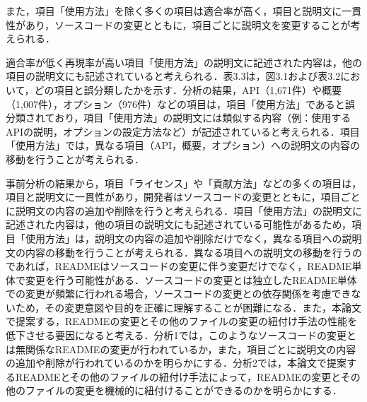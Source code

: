 \documentclass[submit]{ipsj}
\begin{document}
また，項目「使用方法」を除く多くの項目は適合率が高く，項目と説明文に一貫性があり，ソースコードの変更とともに，項目ごとに説明文を変更することが考えられる．

適合率が低く再現率が高い項目「使用方法」の説明文に記述された内容は，他の項目の説明文にも記述されていると考えられる．表3.3は，図3.1および表3.2において，どの項目と誤分類したかを示す．分析の結果，API（1,671件）や概要（1,007件），オプション（976件）などの項目は，項目「使用方法」であると誤分類されており，項目「使用方法」の説明文には類似する内容（例：使用するAPIの説明，オプションの設定方法など）が記述されていると考えられる．項目「使用方法」では，異なる項目（API，概要，オプション）への説明文の内容の移動を行うことが考えられる．


事前分析の結果から，項目「ライセンス」や「貢献方法」などの多くの項目は，項目と説明文に一貫性があり，開発者はソースコードの変更とともに，項目ごとに説明文の内容の追加や削除を行うと考えられる．項目「使用方法」の説明文に記述された内容は，他の項目の説明文にも記述されている可能性があるため，項目「使用方法」は，説明文の内容の追加や削除だけでなく，異なる項目への説明文の内容の移動を行うことが考えられる．異なる項目への説明文の移動を行うのであれば，READMEはソースコードの変更に伴う変更だけでなく，README単体で変更を行う可能性がある．ソースコードの変更とは独立したREADME単体での変更が頻繁に行われる場合，ソースコードの変更との依存関係を考慮できないため，その変更意図や目的を正確に理解することが困難になる．また，本論文で提案する，READMEの変更とその他のファイルの変更の紐付け手法の性能を低下させる要因になると考える．分析1では，このようなソースコードの変更とは無関係なREADMEの変更が行われているか，また，項目ごとに説明文の内容の追加や削除が行われているのかを明らかにする．分析2では，本論文で提案するREADMEとその他のファイルの紐付け手法によって，READMEの変更とその他のファイルの変更を機械的に紐付けることができるのかを明らかにする．



\end{document}
